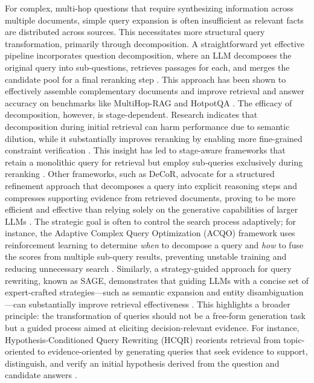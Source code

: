 \documentclass[11pt]{article}
\begin{document}
For complex, multi-hop questions that require synthesizing information across multiple documents, simple query expansion is often insufficient as relevant facts are distributed across sources. This necessitates more structural query transformation, primarily through decomposition. A straightforward yet effective pipeline incorporates question decomposition, where an LLM decomposes the original query into sub-questions, retrieves passages for each, and merges the candidate pool for a final reranking step \cite{ref128}. This approach has been shown to effectively assemble complementary documents and improve retrieval and answer accuracy on benchmarks like MultiHop-RAG and HotpotQA \cite{ref128}. The efficacy of decomposition, however, is stage-dependent. Research indicates that decomposition during initial retrieval can harm performance due to semantic dilution, while it substantially improves reranking by enabling more fine-grained constraint verification \cite{ref129}. This insight has led to stage-aware frameworks that retain a monolithic query for retrieval but employ sub-queries exclusively during reranking \cite{ref129}. Other frameworks, such as DeCoR, advocate for a structured refinement approach that decomposes a query into explicit reasoning steps and compresses supporting evidence from retrieved documents, proving to be more efficient and effective than relying solely on the generative capabilities of larger LLMs \cite{ref130}. The strategic goal is often to control the search process adaptively; for instance, the Adaptive Complex Query Optimization (ACQO) framework uses reinforcement learning to determine \emph{when} to decompose a query and \emph{how} to fuse the scores from multiple sub-query results, preventing unstable training and reducing unnecessary search \cite{ref131}. Similarly, a strategy-guided approach for query rewriting, known as SAGE, demonstrates that guiding LLMs with a concise set of expert-crafted strategies---such as semantic expansion and entity disambiguation---can substantially improve retrieval effectiveness \cite{ref132}. This highlights a broader principle: the transformation of queries should not be a free-form generation task but a guided process aimed at eliciting decision-relevant evidence. For instance, Hypothesis-Conditioned Query Rewriting (HCQR) reorients retrieval from topic-oriented to evidence-oriented by generating queries that seek evidence to support, distinguish, and verify an initial hypothesis derived from the question and candidate answers \cite{ref133}.
\end{document}
